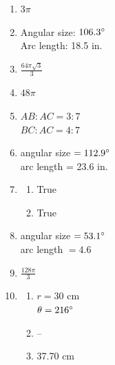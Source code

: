 \documentclass{article}
\begin{document}
\begin{enumerate}
	\begin{enumerate}
	
	\item $72 \degree$
	
	\item $72 \degree$
	
	\item $288 \degree$
	
	\end{enumerate}
	
\item $3 \pi$

\item Angular size: $106.3 \degree$ \\
	Arc length: 18.5 in.
	
\item $\frac{64 \pi \sqrt{3}}{3}$

\item $48 \pi$

\item $AB : AC = 3 : 7$ \\
	$BC : AC = 4 : 7$
	
\item angular size $= 112.9\degree$ \\
	arc length = 23.6 in.
	
\item

	\begin{enumerate}
	
	\item True
	
	\item True
	
	\end{enumerate}
	
\item angular size $= 53.1 \degree$ \\
	arc length $= 4.6$
	
\item $\frac{128 \pi}{3}$

\setcounter{enumi}{127}
\item

	\begin{enumerate}
	
	\item $r = 30$ cm \\
		$\theta = 216 \degree$
		
	\item --
		
	\item 37.70 cm
	

\end{enumerate}
\end{enumerate}
\end{document}

